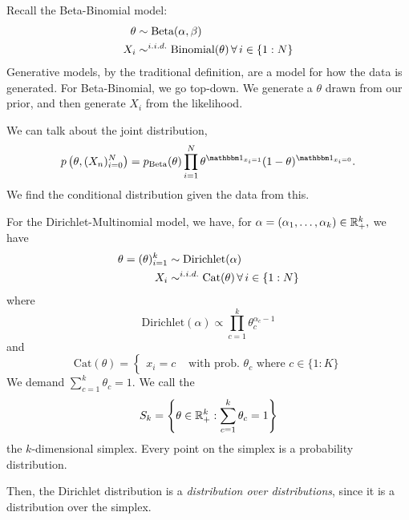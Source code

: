 \documentclass{chaistyle}
\begin{document}
Recall the Beta-Binomial model: \begin{align*}
    \theta&\sim\text{Beta}(\alpha,\beta) \\
    X_i&\sim^{i.i.d.}\text{Binomial}(\theta) \,\forall\, i\in\{1:N\}\\
\end{align*}
Generative models, by the traditional definition, are a model for how the data is generated. For Beta-Binomial, we go top-down. We generate a \(\theta\) drawn from our prior, and then generate \(X_i\) from the likelihood.

We can talk about the joint distribution, \[p\left(\theta,(X_n)_{i=0}^N\right)=p_{\text{Beta}}(\theta)\prod_{i=1}^{N}\theta^{\indic_{x_i=1}}(1-\theta)^{\indic_{x_i=0}}.\] We find the conditional distribution given the data from this.

For the Dirichlet-Multinomial model, we have, for \(\alpha=(\alpha_1,\dots,\alpha_k)\in\mathbb{R}^k_+,\) we have \begin{align*}
    \theta=(\theta)_{i=1}^k&\sim\text{Dirichlet}(\alpha) \\
    X_i&\sim^{i.i.d.}\text{Cat}(\theta) \,\forall\, i\in\{1:N\}\\
\end{align*}
where \[\text{Dirichlet}(\alpha)\propto\prod_{c=1}^{k}\theta_c^{\alpha_c-1}\] and \[\text{Cat}(\theta)=\begin{cases}
    x_i=c&\text{ with prob. \(\theta_c\) where \(c\in\{1:K\}\)}
\end{cases}\] We demand \(\sum_{c=1}^{k} \theta_c=1.\) We call the \[S_k= \left\{\theta\in\mathbb{R}^k_+ : \sum_{c=1}^{k} \theta_c=1 \right\} \] the \(k\)-dimensional simplex. Every point on the simplex is a probability distribution.

Then, the Dirichlet distribution is a \emph{distribution over distributions}, since it is a distribution over the simplex.
\end{document}
